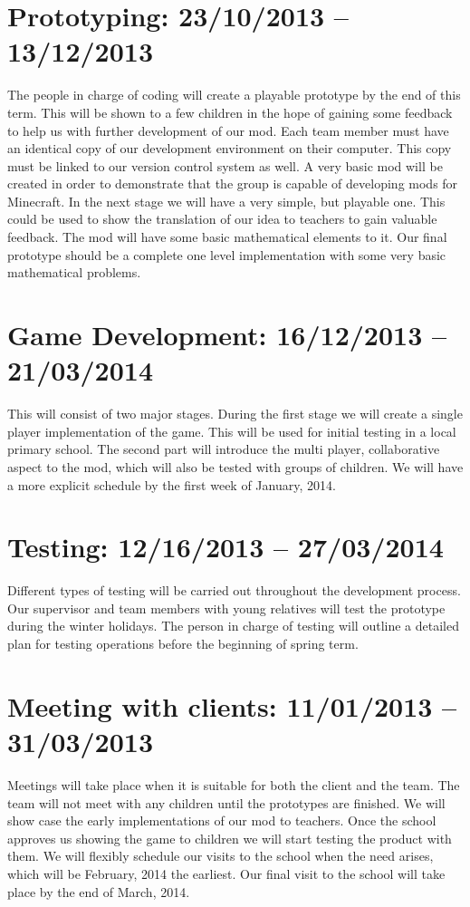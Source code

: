 \section{Prototyping: 23/10/2013 -- 13/12/2013}
The people in charge of coding will create a playable prototype by the end of this term. This will be shown to a few children in the hope of gaining some feedback to help us with further development of our mod.
Each team member must have an identical copy of our development environment on their computer. This copy must be linked to our version control system as well. A very basic mod will be created in order to demonstrate that the group is capable of developing mods for Minecraft. In the next stage we will have a very simple, but playable one. This could be used to show the translation of our idea to teachers to gain valuable feedback. The mod will have some basic mathematical elements to it. Our final prototype should be a complete one level implementation with some very basic mathematical problems.

\section{Game Development: 16/12/2013 -- 21/03/2014}
This will consist of two major stages. During the first stage we will create a single player implementation of the game. This will be used for initial testing in a local primary school. The second part will introduce the multi player, collaborative aspect to the mod, which will also be tested with groups of children. We will have a more explicit schedule by the first week of January, 2014.

\section{Testing: 12/16/2013 -- 27/03/2014}
Different types of testing will be carried out throughout the development process. Our supervisor and team members with young relatives will test the prototype during the winter holidays. The person in charge of testing will outline a detailed plan for testing operations before the beginning of spring term.

\section{Meeting with clients: 11/01/2013 -- 31/03/2013}
Meetings will take place when it is suitable for both the client and the team. The team will not meet with any children until the prototypes are finished. We will show case the early implementations of our mod to teachers. Once the school approves us showing the game to children we will start testing the product with them. We will flexibly schedule our visits to the school when the need arises, which will be February, 2014 the earliest. Our final visit to the school will take place by the end of March, 2014.

